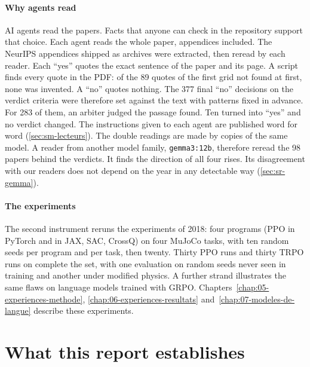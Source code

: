 \paragraph{Why agents read}
AI agents read the papers. Facts that anyone can check in the repository support that choice. Each
agent reads the whole paper, appendices included. The NeurIPS appendices shipped as archives were
extracted, then reread by each reader. Each \enquote{yes} quotes the exact sentence of the paper and
its page. A script finds every quote in the PDF: of the 89 quotes of the first grid not found at
first, none was invented. A \enquote{no} quotes nothing. The 377 final \enquote{no} decisions on the
verdict criteria were therefore set against the text with patterns fixed in advance. For 283 of them,
an arbiter judged the passage found. Ten turned into \enquote{yes} and no verdict changed. The
instructions given to each agent are published word for word (\cref{sec:sm-lecteurs}). The double
readings are made by copies of the same model. A reader from another model family,
\texttt{gemma3:12b}, therefore reread the 98 papers behind the verdicts. It finds the direction of all
four rises. Its disagreement with our readers does not depend on the year in any detectable way
(\cref{sec:sr-gemma}).

\paragraph{The experiments}
The second instrument reruns the experiments of 2018: four programs (PPO in PyTorch and in JAX, SAC, CrossQ) on four MuJoCo tasks, with ten
random seeds per program and per task, then twenty. Thirty PPO runs and thirty TRPO runs on
 complete the set, with one evaluation on random seeds never seen in training and
another under modified physics. A further strand illustrates the same flaws on language models trained
with GRPO. Chapters~\ref{chap:05-experiences-methode}, \ref{chap:06-experiences-resultats}
and~\ref{chap:07-modeles-de-langue} describe these experiments.

\section{What this report establishes}\label{sec:intro-contributions}


